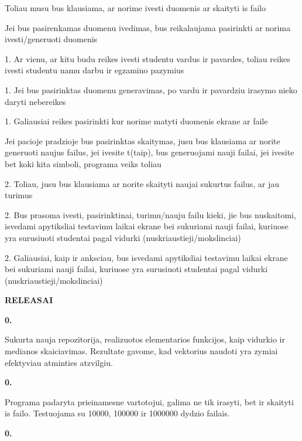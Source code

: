 Toliau musu bus klausiama, ar norime ivesti duomenis ar skaityti is failo


\begin{DoxyEnumerate}
\item Jei bus pasirenkamas duomenu ivedimas, bus reikalaujama pasirinkti ar norima ivesti/generuoti duomenis
\end{DoxyEnumerate}

1. Ar vienu, ar kitu budu reikes ivesti studentu vardus ir pavardes, toliau reikes ivesti studentu namu darbu ir egzamino pazymius

1. Jei bus pasirinktas duomenu generavimas, po vardu ir pavardziu irasymo nieko daryti nebereikes

1. Galiausiai reikes pasirinkti kur norime matyti duomenis ekrane ar faile


\begin{DoxyEnumerate}
\item Jei pacioje pradzioje bus pasirinktas skaitymas, jusu bus klausiama ar norite generuoti naujus failus, jei ivesite \textquotesingle{}t\textquotesingle{}(taip), bus generuojami nauji failai, jei ivesite bet koki kita simboli, programa veiks toliau
\end{DoxyEnumerate}

2. Toliau, jusu bus klausiama ar norite skaityti naujai sukurtus failus, ar jau turimus

2. Bus prasoma ivesti, pasirinktinai, turimu/nauju failu kieki, jie bus nuskaitomi, isvedami apytiksliai testavimu laikai ekrane bei sukuriami nauji failai, kuriuose yra surusiuoti studentai pagal vidurki (nuskriaustieji/mokslinciai)

2. Galiausiai, kaip ir anksciau, bus isvedami apytiksliai testavimu laikai ekrane bei sukuriami nauji failai, kuriuose yra surusiuoti studentai pagal vidurki (nuskriaustieji/mokslinciai)

{\bfseries{RELEASAI}}

{\bfseries{0.}}

Sukurta nauja repozitorija, realizuotos elementarios funkcijos, kaip vidurkio ir medianos skaiciavimas. Rezultate gavome, kad vektorius naudoti yra zymiai efektyviau atminties atzvilgiu.

{\bfseries{0.}}

Programa padaryta prieinamesne vartotojui, galima ne tik irasyti, bet ir skaityti is failo. Testuojama su 10000, 100000 ir 1000000 dydzio failais.

{\bfseries{0.}}

